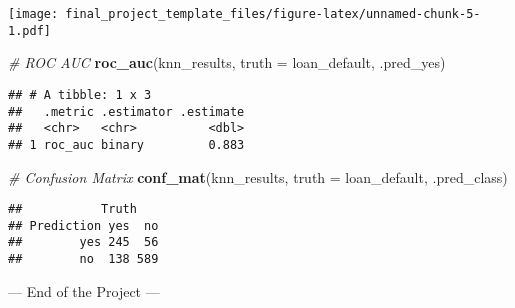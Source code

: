 \documentclass[
]{article}
\newenvironment{Shaded}{\begin{snugshade}}{\end{snugshade}}
\newcommand{\AttributeTok}[1]{\textcolor[rgb]{0.13,0.29,0.53}{#1}}
\newcommand{\CommentTok}[1]{\textcolor[rgb]{0.56,0.35,0.01}{\textit{#1}}}
\newcommand{\FunctionTok}[1]{\textcolor[rgb]{0.13,0.29,0.53}{\textbf{#1}}}
\newcommand{\NormalTok}[1]{#1}
\begin{document}
\texttt{[image: final\_project\_template\_files/figure-latex/unnamed-chunk-5-1.pdf]}

\begin{Shaded}
\begin{Highlighting}[]
\CommentTok{\# ROC AUC}
\FunctionTok{roc\_auc}\NormalTok{(knn\_results, }\AttributeTok{truth =}\NormalTok{ loan\_default, .pred\_yes)}
\end{Highlighting}
\end{Shaded}

\begin{verbatim}
## # A tibble: 1 x 3
##   .metric .estimator .estimate
##   <chr>   <chr>          <dbl>
## 1 roc_auc binary         0.883
\end{verbatim}

\begin{Shaded}
\begin{Highlighting}[]
\CommentTok{\# Confusion Matrix}
\FunctionTok{conf\_mat}\NormalTok{(knn\_results, }\AttributeTok{truth =}\NormalTok{ loan\_default, .pred\_class)}
\end{Highlighting}
\end{Shaded}

\begin{verbatim}
##           Truth
## Prediction yes  no
##        yes 245  56
##        no  138 589
\end{verbatim}

--- End of the Project ---
\end{document}
